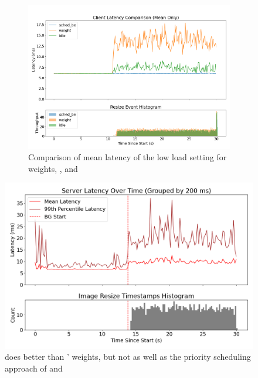 \begin{figure}[t]
\begin{subfigure}[t]{\columnwidth}
        \includegraphics[width=\columnwidth]{graphs/srv-bg-cmp-all.png}
        \caption{Comparison of mean latency of the low load setting for weights,
        \schedidle{}, and \schedbe{}}\label{fig:srv-bg-cmp}
    \end{subfigure}
    \vspace{4pt}
    \caption{}\label{fig:srv-bg-idle}
\end{figure}

\begin{figure}[t]
    \centering
    \includegraphics[width=\columnwidth]{graphs/kubernetes-idle.png}
    \caption{ \schedidle{} does better than \cgroups{}' weights, but not as well
    as the priority scheduling approach of \rtclass{} and \schedbe{}
    }\label{fig:kubernetes-idle}
\end{figure}

